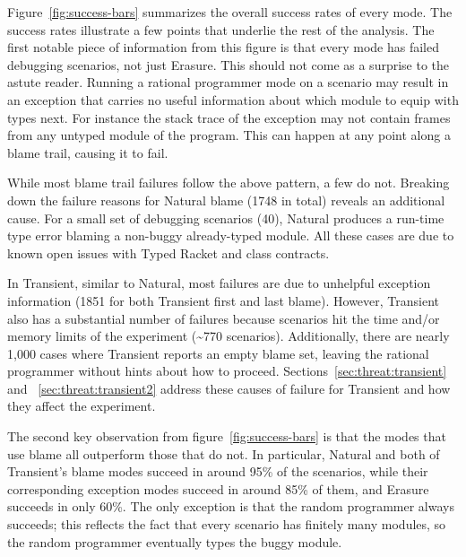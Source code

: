 
Figure~\ref{fig:success-bars} summarizes the overall success rates of
every mode.
The success rates illustrate a few points that underlie the
rest of the analysis.  The first notable piece of information from this
figure is that every mode has failed debugging scenarios, not just
Erasure. This should not come as a surprise to the astute reader.  Running
a rational programmer mode on a scenario may result in an exception
that carries no useful information about which module to equip with types next. For instance the stack trace of the exception may not
contain frames from any untyped module of the program. This can happen at any point
along a blame trail, causing it to fail.

While most blame trail failures follow the above pattern, a few do
not.  Breaking down the failure reasons for Natural blame (1748 in
total) reveals an additional cause. For a small set of debugging scenarios
(40), Natural produces a run-time type error blaming a non-buggy
already-typed module. All these cases are due to known open issues with Typed
Racket and class contracts. 

In Transient, similar to Natural, most failures are due to unhelpful exception
information (1851 for both Transient first and last blame).  However, Transient
also has a substantial number of failures because scenarios hit the time and/or
memory limits of the experiment (\textasciitilde770 scenarios).  Additionally,
there are nearly 1,000 cases where Transient reports an empty blame set, leaving
the rational programmer without hints about how to proceed.
Sections~\ref{sec:threat:transient} and ~\ref{sec:threat:transient2} address
these causes of failure for Transient and how they affect the experiment.

The second key observation from figure~\ref{fig:success-bars} is that the
modes that use blame all outperform those that do not.  In particular,
Natural and both of Transient's blame modes succeed in around 95\% of the
scenarios, while their corresponding exception modes succeed in around
85\% of them, and Erasure succeeds in only 60\%.  The only
exception is that the random programmer always succeeds; this reflects the
fact that every scenario has finitely many modules, so the random programmer 
eventually types the buggy module.

